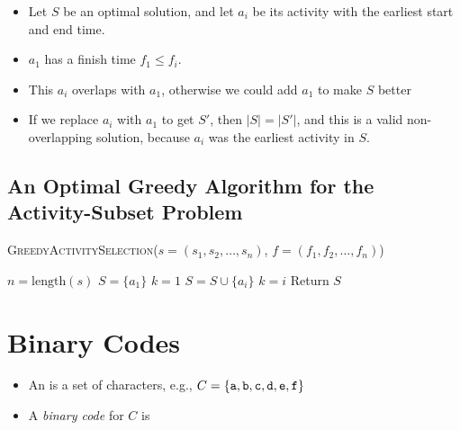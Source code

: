 \documentclass[11  pt]{article}
\newcommand{\ttf}{\tt{f}}
\begin{document}
\begin{itemize}
	\item Let $S$ be an optimal solution, and let $a_i$ be its activity with the earliest start and end time. 
	\item $a_1$ has a finish time $f_1 \leq f_i$. \\
	\item This $a_i$ overlaps with $a_1$, otherwise we could add $a_1$ to make $S$ better\\
	\item If we replace $a_i$ with $a_1$ to get $S'$, then $|S| = |S'|$, and this is a valid non-overlapping solution, because $a_i$ was the earliest activity in $S$.
\end{itemize}

\newpage
\subsection{An Optimal Greedy Algorithm for the Activity-Subset Problem}

\begin{algorithm}
	\textsc{GreedyActivitySelection}($s = (s_1, s_2, \hdots , s_n)$, $f = (f_1, f_2, \hdots , f_n)$)
	\begin{algorithmic}
		\State $n = \text{length}(s)$
		\State $S = \{a_1\}$
		\State $k = 1$		\;\;\;  %
		\State  %
		\State $S = S \cup \{a_i\}$
		\State 
		\State $k = i$
		\State
		\EndIf
		\EndFor
		\State Return $S$
	\end{algorithmic}
\end{algorithm}



\newpage

\section{Binary Codes}

\begin{itemize}
	\item An  is a set of characters, e.g., $C = \{\tt{a},\tt{b}, \tt{c},\tt{d} ,\tt{e}, \ttf\}$ \\
	\item A \emph{binary code} for $C$ is\\ %
\end{itemize}
\end{document}
